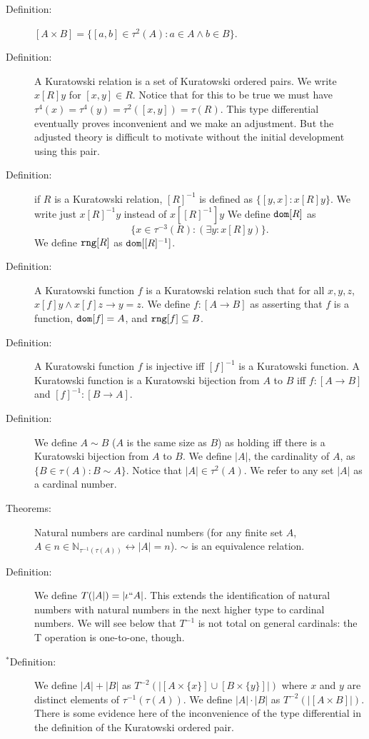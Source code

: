 \documentclass[12pt]{article}
\begin{document}
\begin{description}

\item[Definition:]  $[A\times B] = \{[a,b] \in \tau^2(A):a \in A \wedge b \in B\}$.

\item[Definition:]  A Kuratowski relation is a set of Kuratowski ordered pairs.  We write $x [R] y$ for $[x,y] \in R$.  Notice that for this to be true
we must have $\tau^4(x) = \tau^4(y) = \tau^2([x,y]) = \tau(R)$.  This type differential eventually proves inconvenient and we make an adjustment.  But the adjusted
theory is difficult to motivate without the initial development using this pair.

\item[Definition:]  if $R$ is a Kuratowski relation, $[R]^{-1}$ is defined as $\{[y,x]:x[R]y\}$.  We write just $x[R]^{-1}y$ instead of $x[[R]^{-1}]y$
We define ${\tt dom}[R]$ as $$\{x \in \tau^{-3}(R):(\exists y:x[R]y)\}.$$  We define ${\tt rng}[R]$ as ${\tt dom}[[R]^{-1}]$.

\item[Definition:]  A Kuratowski function $f$ is a Kuratowski relation such that for all $x,y,z$, $x[f]y \wedge x[f]z \rightarrow y=z$.  We define $f:[A \rightarrow B]$ as asserting
that $f$ is a function, ${\tt dom}[f] = A$, and ${\tt rng}[f] \subseteq B$.

\item[Definition:]  A Kuratowski function $f$ is injective iff $[f]^{-1}$ is a Kuratowski function.  A Kuratowski function is a Kuratowski bijection from $A$ to $B$ iff $f:[A \rightarrow B]$
and $[f]^{-1}:[B \rightarrow A]$.

\item[Definition:]  We define $A \sim B$ ($A$ is the same size as $B$) as holding iff there is a Kuratowski bijection from $A$ to $B$.  We define $|A|$, the cardinality of $A$,
as $\{B \in \tau(A):B \sim A\}$.  Notice that $|A| \in \tau^2(A)$.  We refer to any set $|A|$ as a cardinal number.

\item[Theorems:]  Natural numbers are cardinal numbers (for any finite set $A$, $A \in n \in \mathbb N_{\tau^{-1}(\tau(A))} \leftrightarrow |A|=n$).  $\sim$ is an equivalence relation.

\item[Definition:]  We define $T(|A|) = |\iota``A|$.  This extends the identification of natural numbers with natural numbers in the next higher type to cardinal numbers.
We will see below that $T^{-1}$ is not total on general cardinals:  the T operation is one-to-one, though.

\item[$^*$Definition:]  We define $|A|+|B|$ as $T^{-2}(|[A \times \{x\}] \cup [B \times \{y\}]|)$ where $x$ and $y$ are distinct elements of $\tau^{-1}(\tau(A))$.  We define
$|A| \cdot |B|$ as $T^{-2}(|[A \times B]|)$.  There is some evidence here of the inconvenience of the type differential in the definition of the Kuratowski ordered pair.

\end{description}
\end{document}
